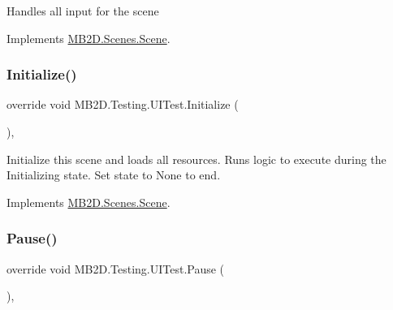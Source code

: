 Handles all input for the scene 



Implements \hyperlink{class_m_b2_d_1_1_scenes_1_1_scene_a476de5a885408d27ff151044d20738c8}{M\+B2\+D.\+Scenes.\+Scene}.

\hypertarget{class_m_b2_d_1_1_testing_1_1_u_i_test_af6f33faaa93d646edd5c74dfee6139d1}{}\label{class_m_b2_d_1_1_testing_1_1_u_i_test_af6f33faaa93d646edd5c74dfee6139d1} 
\subsubsection{\texorpdfstring{Initialize()}{Initialize()}}
{\footnotesize\ttfamily override void M\+B2\+D.\+Testing.\+U\+I\+Test.\+Initialize (\begin{DoxyParamCaption}{ }\end{DoxyParamCaption})\hspace{0.3cm}{\ttfamily [inline]}, {\ttfamily [virtual]}}



Initialize this scene and loads all resources. Runs logic to execute during the Initializing state. Set state to None to end. 



Implements \hyperlink{class_m_b2_d_1_1_scenes_1_1_scene_a081b4f8866936b495bdce388a7c96c25}{M\+B2\+D.\+Scenes.\+Scene}.

\hypertarget{class_m_b2_d_1_1_testing_1_1_u_i_test_ae829ddfd489047674efb3131d360901a}{}\label{class_m_b2_d_1_1_testing_1_1_u_i_test_ae829ddfd489047674efb3131d360901a} 
\subsubsection{\texorpdfstring{Pause()}{Pause()}}
{\footnotesize\ttfamily override void M\+B2\+D.\+Testing.\+U\+I\+Test.\+Pause (\begin{DoxyParamCaption}{ }\end{DoxyParamCaption})\hspace{0.3cm}{\ttfamily [inline]}, {\ttfamily [virtual]}}



